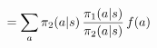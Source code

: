 \documentclass[preview]{standalone}
\begin{document}
\begin{align*}
\special{dvisvgm:raw <g id='unique000'>}= \sum_a \pi_2(a|s)\, \frac{\pi_1(a|s)}{\pi_2(a|s)}\, f(a)\special{dvisvgm:raw </g>}
\end{align*}
\end{document}
